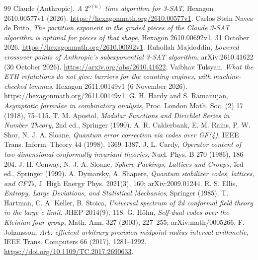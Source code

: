 \documentclass[10pt,a4paper]{article}
\numberwithin{equation}{section}
\theoremstyle{remark}\newtheorem{remark}[theorem]{Remark}\newtheorem{question}[theorem]{Question}
\begin{document}
\begin{thebibliography}{99}\small
{} Claude (Anthropic), \emph{A $2^{o(n)}$ time algorithm for 3-SAT}, Hexagon 2610.00577v1 (2026). \url{https://hexagonmath.org/2610.00577v1}.
 Carlos Stein Naves de Brito, \emph{The partition exponent in the graded pieces of the Claude 3-SAT algorithm is optimal for pieces of that shape}, Hexagon 2610.00692v1, 31 October 2026. \url{https://hexagonmath.org/2610.00692v1}.
 Ruhollah Majdoddin, \emph{Lowered crossover points of Anthropic's subexponential 3-SAT algorithm}, arXiv:2610.41622 (30 October 2026). \url{https://arxiv.org/abs/2610.41622}.
 Vaibhav Tulsyan, \emph{What the ETH refutations do not give: barriers for the counting engines, with machine-checked lemmas}, Hexagon 2611.00149v1 (6 November 2026). \url{https://hexagonmath.org/2611.00149v1}.
 G. H. Hardy and S. Ramanujan, \emph{Asymptotic formulae in combinatory analysis}, Proc. London Math. Soc. (2) 17 (1918), 75--115.
 T. M. Apostol, \emph{Modular Functions and Dirichlet Series in Number Theory}, 2nd ed., Springer (1990).
 A. R. Calderbank, E. M. Rains, P. W. Shor, N. J. A. Sloane, \emph{Quantum error correction via codes over GF(4)}, IEEE Trans. Inform. Theory 44 (1998), 1369--1387.
 J. L. Cardy, \emph{Operator content of two-dimensional conformally invariant theories}, Nucl. Phys. B 270 (1986), 186--204.
 J. H. Conway, N. J. A. Sloane, \emph{Sphere Packings, Lattices and Groups}, 3rd ed., Springer (1999).
 A. Dymarsky, A. Shapere, \emph{Quantum stabilizer codes, lattices, and CFTs}, J. High Energy Phys. 2021(3), 160; arXiv:2009.01244.
 R. S. Ellis, \emph{Entropy, Large Deviations, and Statistical Mechanics}, Springer (1985).
 T. Hartman, C. A. Keller, B. Stoica, \emph{Universal spectrum of 2d conformal field theory in the large c limit}, JHEP 2014(9), 118.
 G. H\"ohn, \emph{Self-dual codes over the Kleinian four group}, Math. Ann. 327 (2003), 227--255; arXiv:math/0005266.
 F. Johansson, \emph{Arb: efficient arbitrary-precision midpoint-radius interval arithmetic}, IEEE Trans. Computers 66 (2017), 1281--1292. \url{https://doi.org/10.1109/TC.2017.2690633}.
\end{thebibliography}
\end{document}
